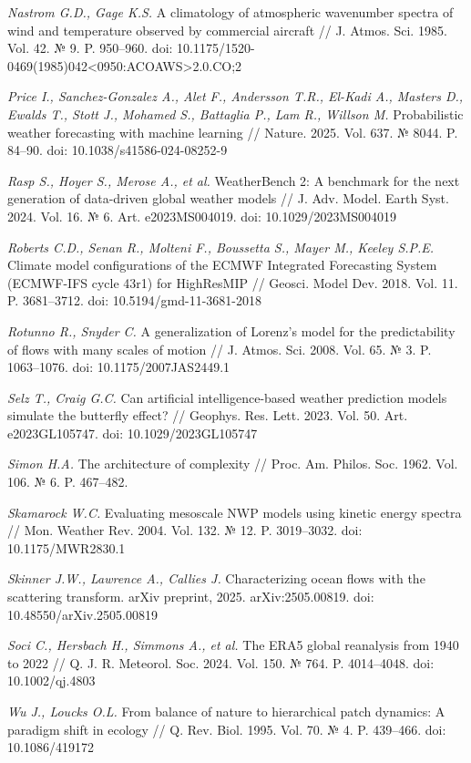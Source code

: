 \documentclass[12pt,a4paper]{article}
\begin{document}
\noindent \textit{Nastrom G.D., Gage K.S.} A climatology of atmospheric wavenumber spectra of wind and temperature observed by commercial aircraft // J. Atmos. Sci. 1985. Vol. 42. № 9. P. 950–960. doi: 10.1175/1520-0469(1985)042<0950:ACOAWS>2.0.CO;2

\noindent \textit{Price I., Sanchez-Gonzalez A., Alet F., Andersson T.R., El-Kadi A., Masters D., Ewalds T., Stott J., Mohamed S., Battaglia P., Lam R., Willson M.} Probabilistic weather forecasting with machine learning // Nature. 2025. Vol. 637. № 8044. P. 84–90. doi: 10.1038/s41586-024-08252-9

\noindent \textit{Rasp S., Hoyer S., Merose A., et al.} WeatherBench 2: A benchmark for the next generation of data-driven global weather models // J. Adv. Model. Earth Syst. 2024. Vol. 16. № 6. Art. e2023MS004019. doi: 10.1029/2023MS004019

\noindent \textit{Roberts C.D., Senan R., Molteni F., Boussetta S., Mayer M., Keeley S.P.E.} Climate model configurations of the ECMWF Integrated Forecasting System (ECMWF-IFS cycle 43r1) for HighResMIP // Geosci. Model Dev. 2018. Vol. 11. P. 3681–3712. doi: 10.5194/gmd-11-3681-2018

\noindent \textit{Rotunno R., Snyder C.} A generalization of Lorenz's model for the predictability of flows with many scales of motion // J. Atmos. Sci. 2008. Vol. 65. № 3. P. 1063–1076. doi: 10.1175/2007JAS2449.1

\noindent \textit{Selz T., Craig G.C.} Can artificial intelligence-based weather prediction models simulate the butterfly effect? // Geophys. Res. Lett. 2023. Vol. 50. Art. e2023GL105747. doi: 10.1029/2023GL105747

\noindent \textit{Simon H.A.} The architecture of complexity // Proc. Am. Philos. Soc. 1962. Vol. 106. № 6. P. 467–482.

\noindent \textit{Skamarock W.C.} Evaluating mesoscale NWP models using kinetic energy spectra // Mon. Weather Rev. 2004. Vol. 132. № 12. P. 3019–3032. doi: 10.1175/MWR2830.1

\noindent \textit{Skinner J.W., Lawrence A., Callies J.} Characterizing ocean flows with the scattering transform. arXiv preprint, 2025. arXiv:2505.00819. doi: 10.48550/arXiv.2505.00819

\noindent \textit{Soci C., Hersbach H., Simmons A., et al.} The ERA5 global reanalysis from 1940 to 2022 // Q. J. R. Meteorol. Soc. 2024. Vol. 150. № 764. P. 4014–4048. doi: 10.1002/qj.4803

\noindent \textit{Wu J., Loucks O.L.} From balance of nature to hierarchical patch dynamics: A paradigm shift in ecology // Q. Rev. Biol. 1995. Vol. 70. № 4. P. 439–466. doi: 10.1086/419172
\end{document}
